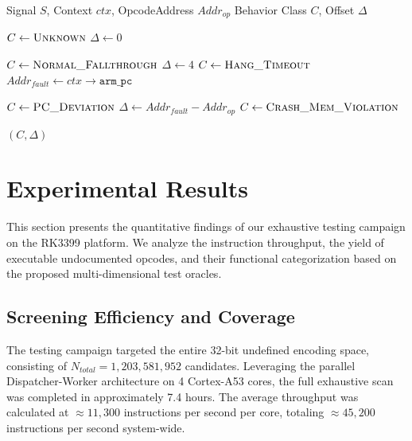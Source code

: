 \documentclass[pdflatex,sn-mathphys]{sn-jnl}%
\theoremstyle{thmstyleone}%
\theoremstyle{thmstyletwo}%
\theoremstyle{thmstylethree}%
\begin{document}
\begin{algorithm}[h]
\caption{Signal-Based Control Flow Classification}
\label{alg:signal_logic}
\begin{algorithmic}[1]
\Require Signal $S$, Context $ctx$, OpcodeAddress $Addr_{op}$
\Ensure Behavior Class $C$, Offset $\Delta$

\State $C \leftarrow \textsc{Unknown}$
\State $\Delta \leftarrow 0$

    \State $C \leftarrow \textsc{Normal\_Fallthrough}$
    \State $\Delta \leftarrow 4$ 
    \State $C \leftarrow \textsc{Hang\_Timeout}$
    \State $Addr_{fault} \leftarrow ctx \to \texttt{arm\_pc}$ 
    
        \State $C \leftarrow \textsc{PC\_Deviation}$
        \State $\Delta \leftarrow Addr_{fault} - Addr_{op}$ 
    \Else
        \State $C \leftarrow \textsc{Crash\_Mem\_Violation}$ 
    \EndIf
\EndIf

\State \Return $(C, \Delta)$
\end{algorithmic}
\end{algorithm}

\section{Experimental Results}\label{sec:results}

This section presents the quantitative findings of our exhaustive testing campaign on the RK3399 platform. We analyze the instruction throughput, the yield of executable undocumented opcodes, and their functional categorization based on the proposed multi-dimensional test oracles.

\subsection{Screening Efficiency and Coverage}
The testing campaign targeted the entire 32-bit undefined encoding space, consisting of $N_{total} = 1,203,581,952$ candidates. Leveraging the parallel Dispatcher-Worker architecture on 4 Cortex-A53 cores, the full exhaustive scan was completed in approximately 7.4 hours. 
The average throughput was calculated at $\approx 11,300$ instructions per second per core, totaling $\approx 45,200$ instructions per second system-wide.
\end{document}
